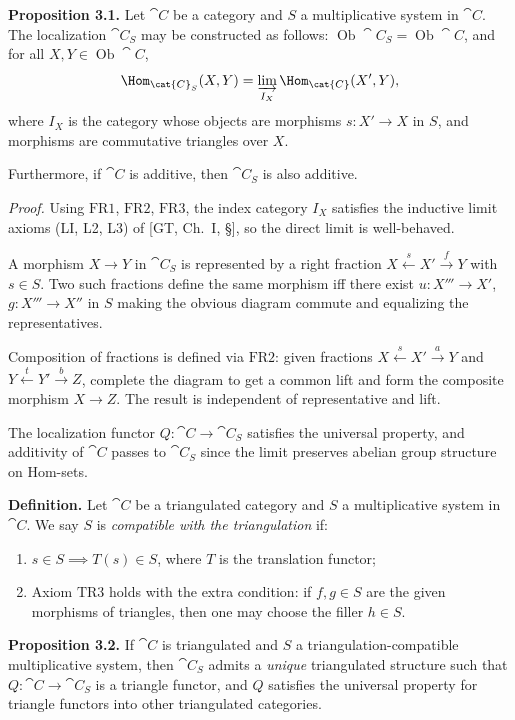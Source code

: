 \medskip
\textbf{Proposition 3.1.}
Let \(\cat{C}\) be a category and \(S\) a multiplicative system in \(\cat{C}\). The localization \(\cat{C}_S\) may be constructed as follows:
\(\operatorname{Ob}\cat{C}_S = \operatorname{Ob}\cat{C}\), and for all \(X,Y\in\operatorname{Ob}\cat{C}\),
\[
\Hom_{\cat{C}_S}(X,Y) = \varinjlim_{I_X} \Hom_{\cat{C}}(X',Y),
\]
where \(I_X\) is the category whose objects are morphisms \(s\colon X'\to X\) in \(S\), and morphisms are commutative triangles over \(X\).

\setcounter{page}{30}
Furthermore, if \(\cat{C}\) is additive, then \(\cat{C}_S\) is also additive.

\textit{Proof.}
Using \(\text{FR1}\), \(\text{FR2}\), \(\text{FR3}\), the index category \(I_X\) satisfies the inductive limit axioms (LI, L2, L3) of [GT, Ch.\ I, \S], so the direct limit is well-behaved.

A morphism \(X\to Y\) in \(\cat{C}_S\) is represented by a right fraction \(X\xleftarrow{s}X'\xrightarrow{f}Y\) with \(s\in S\). Two such fractions define the same morphism iff there exist \(u\colon X'''\to X'\), \(g\colon X'''\to X''\) in \(S\) making the obvious diagram commute and equalizing the representatives.

\setcounter{page}{31}
Composition of fractions is defined via \(\text{FR2}\): given fractions \(X\xleftarrow{s}X'\xrightarrow{a}Y\) and \(Y\xleftarrow{t}Y'\xrightarrow{b}Z\), complete the diagram to get a common lift and form the composite morphism \(X\to Z\). The result is independent of representative and lift.

The localization functor \(Q\colon\cat{C}\to\cat{C}_S\) satisfies the universal property, and additivity of \(\cat{C}\) passes to \(\cat{C}_S\) since the limit preserves abelian group structure on Hom-sets.

\medskip
\textbf{Definition.}
Let \(\cat{C}\) be a triangulated category and \(S\) a multiplicative system in \(\cat{C}\). We say \(S\) is \textit{compatible with the triangulation} if:
\begin{enumerate}
\item[(FR4)] \(s\in S \implies T(s)\in S\), where \(T\) is the translation functor;
\item[(FR5)] Axiom \(\text{TR3}\) holds with the extra condition: if \(f,g\in S\) are the given morphisms of triangles, then one may choose the filler \(h\in S\).
\end{enumerate}

\setcounter{page}{32}
\textbf{Proposition 3.2.}
If \(\cat{C}\) is triangulated and \(S\) a triangulation-compatible multiplicative system, then \(\cat{C}_S\) admits a \textit{unique} triangulated structure such that \(Q\colon\cat{C}\to\cat{C}_S\) is a triangle functor, and \(Q\) satisfies the universal property for triangle functors into other triangulated categories.

